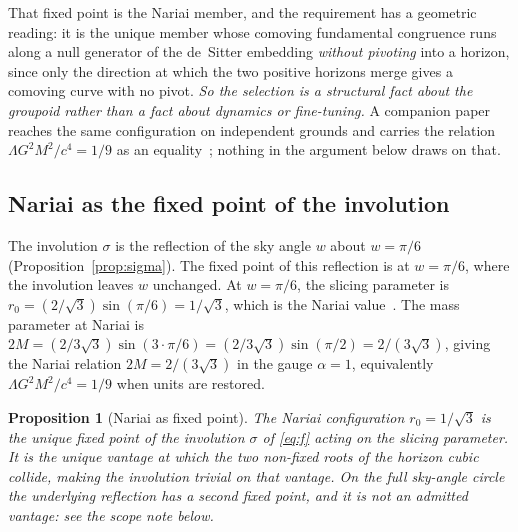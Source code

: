 \documentclass[11pt,a4paper]{article}
\newtheorem{proposition}[theorem]{Proposition}
\theoremstyle{definition}
\begin{document}
That fixed point is the Nariai member, and the requirement has a geometric reading: it is the unique member whose comoving fundamental congruence runs along a null generator of the de~Sitter embedding \emph{without pivoting} into a horizon, since only the direction at which the two positive horizons merge gives a comoving curve with no pivot. \emph{So the selection is a structural fact about the groupoid rather than a fact about dynamics or fine-tuning.} A companion paper reaches the same configuration on independent grounds and carries the relation $\Lambda G^{2}M^{2}/c^{4}=1/9$ as an equality~\cite{JanzenCRframework}; nothing in the argument below draws on that.

\subsection{Nariai as the fixed point of the involution}\label{sec:nariai-fixed}

The involution $\sigma$ is the reflection of the sky angle $w$ about $w=\pi/6$ (Proposition~\ref{prop:sigma}). The fixed point of this reflection is at $w=\pi/6$, where the involution leaves $w$ unchanged. At $w=\pi/6$, the slicing parameter is $r_{0}=(2/\sqrt{3})\sin(\pi/6)=1/\sqrt{3}$, which is the Nariai value~\cite{Nariai1951}. The mass parameter at Nariai is $2M=(2/3\sqrt{3})\sin(3\cdot\pi/6)=(2/3\sqrt{3})\sin(\pi/2)=2/(3\sqrt{3})$, giving the Nariai relation $2M=2/(3\sqrt{3})$ in the gauge $\alpha=1$, equivalently $\Lambda G^{2}M^{2}/c^{4}=1/9$ when units are restored.

\begin{proposition}[Nariai as fixed point]\label{prop:nariai-fixed}
The Nariai configuration $r_{0}=1/\sqrt{3}$ is the unique fixed point of the involution $\sigma$ of \eqref{eq:f} acting on the slicing parameter. It is the unique vantage at which the two non-fixed roots of the horizon cubic collide, making the involution trivial on that vantage. \emph{On the full sky-angle circle the underlying reflection has a second fixed point, and it is not an admitted vantage}: see the scope note below.
\end{proposition}
\end{document}
